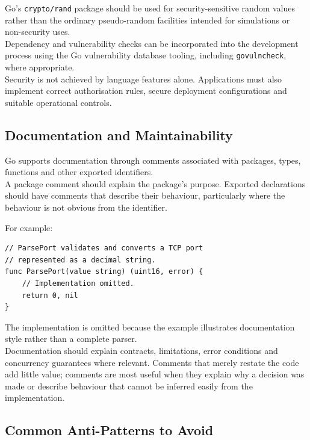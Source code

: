 Go's \texttt{crypto/rand} package should be used for security-sensitive random values rather than the ordinary pseudo-random facilities intended for simulations or non-security uses.\\

Dependency and vulnerability checks can be incorporated into the development process using the Go vulnerability database tooling, including \texttt{govulncheck}, where appropriate.\\

Security is not achieved by language features alone. Applications must also implement correct authorisation rules, secure deployment configurations and suitable operational controls.\\

\subsection{Documentation and Maintainability}

Go supports documentation through comments associated with packages, types, functions and other exported identifiers.\\

A package comment should explain the package's purpose. Exported declarations should have comments that describe their behaviour, particularly where the behaviour is not obvious from the identifier.

For example:

\begin{lstlisting}
// ParsePort validates and converts a TCP port
// represented as a decimal string.
func ParsePort(value string) (uint16, error) {
    // Implementation omitted.
    return 0, nil
}
\end{lstlisting}

The implementation is omitted because the example illustrates documentation style rather than a complete parser.\\

Documentation should explain contracts, limitations, error conditions and concurrency guarantees where relevant. Comments that merely restate the code add little value; comments are most useful when they explain why a decision was made or describe behaviour that cannot be inferred easily from the implementation.

\subsection{Common Anti-Patterns to Avoid}

